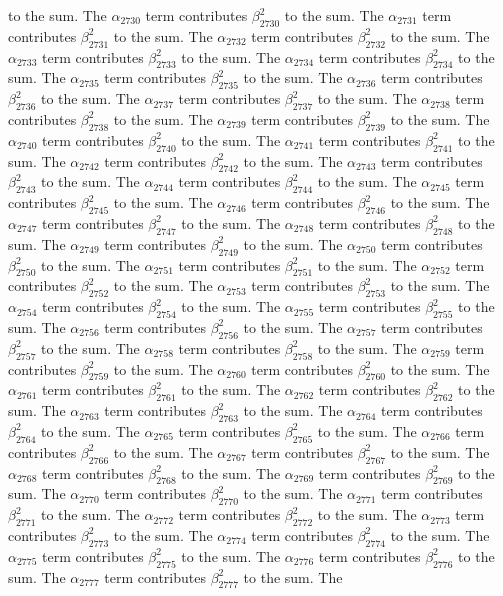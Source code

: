 \begin{lemma}
to the sum. The $\alpha_{2730}$ term contributes $\beta_{2730}^{2}$ to the sum. The $\alpha_{2731}$ term contributes $\beta_{2731}^{2}$ to the sum. The $\alpha_{2732}$ term contributes $\beta_{2732}^{2}$ to the sum. The $\alpha_{2733}$ term contributes $\beta_{2733}^{2}$ to the sum. The $\alpha_{2734}$ term contributes $\beta_{2734}^{2}$ to the sum. The $\alpha_{2735}$ term contributes $\beta_{2735}^{2}$ to the sum. The $\alpha_{2736}$ term contributes $\beta_{2736}^{2}$ to the sum. The $\alpha_{2737}$ term contributes $\beta_{2737}^{2}$ to the sum. The $\alpha_{2738}$ term contributes $\beta_{2738}^{2}$ to the sum. The $\alpha_{2739}$ term contributes $\beta_{2739}^{2}$ to the sum. The $\alpha_{2740}$ term contributes $\beta_{2740}^{2}$ to the sum. The $\alpha_{2741}$ term contributes $\beta_{2741}^{2}$ to the sum. The $\alpha_{2742}$ term contributes $\beta_{2742}^{2}$ to the sum. The $\alpha_{2743}$ term contributes $\beta_{2743}^{2}$ to the sum. The $\alpha_{2744}$ term contributes $\beta_{2744}^{2}$ to the sum. The $\alpha_{2745}$ term contributes $\beta_{2745}^{2}$ to the sum. The $\alpha_{2746}$ term contributes $\beta_{2746}^{2}$ to the sum. The $\alpha_{2747}$ term contributes $\beta_{2747}^{2}$ to the sum. The $\alpha_{2748}$ term contributes $\beta_{2748}^{2}$ to the sum. The $\alpha_{2749}$ term contributes $\beta_{2749}^{2}$ to the sum. The $\alpha_{2750}$ term contributes $\beta_{2750}^{2}$ to the sum. The $\alpha_{2751}$ term contributes $\beta_{2751}^{2}$ to the sum. The $\alpha_{2752}$ term contributes $\beta_{2752}^{2}$ to the sum. The $\alpha_{2753}$ term contributes $\beta_{2753}^{2}$ to the sum. The $\alpha_{2754}$ term contributes $\beta_{2754}^{2}$ to the sum. The $\alpha_{2755}$ term contributes $\beta_{2755}^{2}$ to the sum. The $\alpha_{2756}$ term contributes $\beta_{2756}^{2}$ to the sum. The $\alpha_{2757}$ term contributes $\beta_{2757}^{2}$ to the sum. The $\alpha_{2758}$ term contributes $\beta_{2758}^{2}$ to the sum. The $\alpha_{2759}$ term contributes $\beta_{2759}^{2}$ to the sum. The $\alpha_{2760}$ term contributes $\beta_{2760}^{2}$ to the sum. The $\alpha_{2761}$ term contributes $\beta_{2761}^{2}$ to the sum. The $\alpha_{2762}$ term contributes $\beta_{2762}^{2}$ to the sum. The $\alpha_{2763}$ term contributes $\beta_{2763}^{2}$ to the sum. The $\alpha_{2764}$ term contributes $\beta_{2764}^{2}$ to the sum. The $\alpha_{2765}$ term contributes $\beta_{2765}^{2}$ to the sum. The $\alpha_{2766}$ term contributes $\beta_{2766}^{2}$ to the sum. The $\alpha_{2767}$ term contributes $\beta_{2767}^{2}$ to the sum. The $\alpha_{2768}$ term contributes $\beta_{2768}^{2}$ to the sum. The $\alpha_{2769}$ term contributes $\beta_{2769}^{2}$ to the sum. The $\alpha_{2770}$ term contributes $\beta_{2770}^{2}$ to the sum. The $\alpha_{2771}$ term contributes $\beta_{2771}^{2}$ to the sum. The $\alpha_{2772}$ term contributes $\beta_{2772}^{2}$ to the sum. The $\alpha_{2773}$ term contributes $\beta_{2773}^{2}$ to the sum. The $\alpha_{2774}$ term contributes $\beta_{2774}^{2}$ to the sum. The $\alpha_{2775}$ term contributes $\beta_{2775}^{2}$ to the sum. The $\alpha_{2776}$ term contributes $\beta_{2776}^{2}$ to the sum. The $\alpha_{2777}$ term contributes $\beta_{2777}^{2}$ to the sum. The 
\end{lemma}

